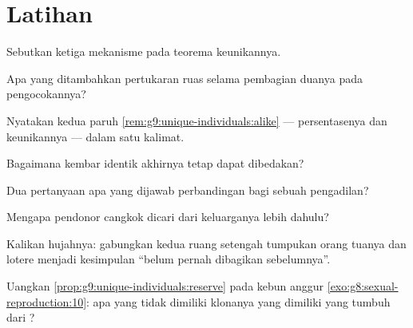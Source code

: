 \section{Latihan}

\begin{exercise}[$\star$]\label{exo:g9:unique-individuals:1}
Sebutkan ketiga mekanisme pada teorema keunikannya.
\end{exercise}

\begin{exercise}[$\star$]\label{exo:g9:unique-individuals:2}
Apa yang ditambahkan pertukaran ruas selama pembagian duanya
pada pengocokannya?
\end{exercise}

\begin{exercise}[$\star$]\label{exo:g9:unique-individuals:3}
Nyatakan kedua paruh \cref{rem:g9:unique-individuals:alike}
--- persentasenya dan keunikannya --- dalam satu kalimat.
\end{exercise}

\begin{exercise}[$\star$]\label{exo:g9:unique-individuals:4}
Bagaimana kembar identik akhirnya tetap dapat dibedakan?
\end{exercise}

\begin{exercise}[$\star$]\label{exo:g9:unique-individuals:5}
Dua pertanyaan apa yang dijawab perbandingan  bagi sebuah
pengadilan?
\end{exercise}

\begin{exercise}[$\star$]\label{exo:g9:unique-individuals:6}
Mengapa pendonor cangkok dicari dari keluarganya lebih dahulu?
\end{exercise}

\begin{exercise}[$\star\star$]\label{exo:g9:unique-individuals:7}
Kalikan hujahnya: gabungkan kedua ruang setengah tumpukan
orang tuanya dan lotere  menjadi kesimpulan
``belum pernah dibagikan sebelumnya''.
\end{exercise}

\begin{exercise}[$\star\star$]\label{exo:g9:unique-individuals:8}
Uangkan \cref{prop:g9:unique-individuals:reserve} pada kebun
anggur \cref{exo:g8:sexual-reproduction:10}: apa yang tidak
dimiliki klonanya yang dimiliki  yang tumbuh dari ?
\end{exercise}

